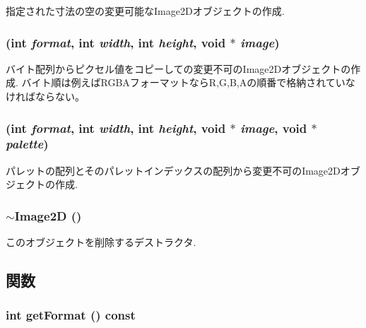 指定された寸法の空の変更可能なImage2Dオブジェクトの作成. \hypertarget{classm3g_1_1Image2D_8cf9a47f24ed50fe66686c1117fb048c}{
\subsubsection[{Image2D}]{ (int {\em format}, \/  int {\em width}, \/  int {\em height}, \/  void $\ast$ {\em image})}}
\label{classm3g_1_1Image2D_8cf9a47f24ed50fe66686c1117fb048c}


バイト配列からピクセル値をコピーしての変更不可のImage2Dオブジェクトの作成. バイト順は例えばRGBAフォーマットならR,G,B,Aの順番で格納されていなければならない。 \hypertarget{classm3g_1_1Image2D_f498914ceac20ff9b1708c55ff1484e6}{
\subsubsection[{Image2D}]{ (int {\em format}, \/  int {\em width}, \/  int {\em height}, \/  void $\ast$ {\em image}, \/  void $\ast$ {\em palette})}}
\label{classm3g_1_1Image2D_f498914ceac20ff9b1708c55ff1484e6}


パレットの配列とそのパレットインデックスの配列から変更不可のImage2Dオブジェクトの作成. \hypertarget{classm3g_1_1Image2D_7ac703fe7edbb053dd2246ea1bb43200}{
\subsubsection[{$\sim$Image2D}]{\setlength{\rightskip}{0pt plus 5cm}$\sim${\bf Image2D} ()}}
\label{classm3g_1_1Image2D_7ac703fe7edbb053dd2246ea1bb43200}


このオブジェクトを削除するデストラクタ. 

\subsection{関数}
\hypertarget{classm3g_1_1Image2D_c08e2752176d267cc4429d4d185975b8}{
\subsubsection[{getFormat}]{\setlength{\rightskip}{0pt plus 5cm}int getFormat () const}}
\label{classm3g_1_1Image2D_c08e2752176d267cc4429d4d185975b8}


